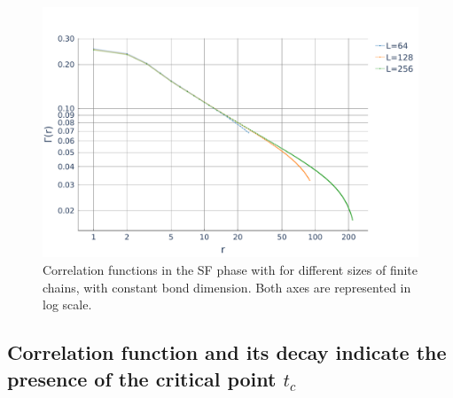 \documentclass[twoside,twocolumn,9pt]{article}
\begin{document}
\begin{center}
  \begin{figure}
      \includegraphics[width=\linewidth]{../code/figures/Correlations-lengths.pdf}
      \caption{Correlation functions in the SF phase with for different sizes of finite chains, with constant bond dimension. Both axes are represented in log scale.}
      \label{fig:lengths}
  \end{figure}
\end{center}

\subsection{Correlation function and its decay indicate the presence of the critical point $t_c$}
\end{document}
